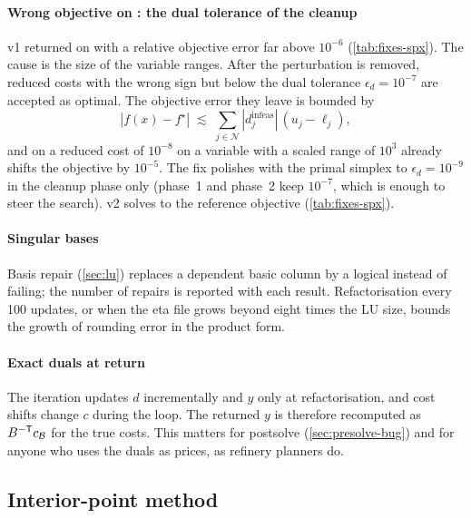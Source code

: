 \paragraph{Wrong objective on : the dual tolerance of the cleanup}
v1 returned  on  with a relative objective error far above $10^{-6}$
(\cref{tab:fixes-spx}). The cause is the size of the variable ranges. After the perturbation is removed, reduced costs with the
wrong sign but below the dual tolerance $\epsilon_d=10^{-7}$ are accepted as optimal. The objective
error they leave is bounded by
\begin{equation}\label{eq:dualerr}
  |f(x)-f^\star| \;\lesssim\; \sum_{j\in\mathcal N} |d_j^{\text{infeas}}|\,(u_j-\ell_j),
\end{equation}
and on  a reduced cost of $10^{-8}$ on a variable with a scaled range of $10^3$ already
shifts the objective by $10^{-5}$. The fix polishes with the primal simplex to $\epsilon_d=10^{-9}$ in
the cleanup phase only (phase~1 and phase~2 keep $10^{-7}$, which is enough to steer the search).
v2 solves  to the reference objective (\cref{tab:fixes-spx}).

\paragraph{Singular bases}
Basis repair (\cref{sec:lu}) replaces a dependent basic column by a logical instead of failing; the
number of repairs is reported with each result. Refactorisation every 100 updates, or when the eta
file grows beyond eight times the LU size, bounds the growth of rounding error in the product form.

\paragraph{Exact duals at return}
The iteration updates $d$ incrementally and $y$ only at refactorisation, and cost shifts change $c$
during the loop. The returned $y$ is therefore recomputed as $B^{-\mathsf{T}} c_{\mathcal B}$ for the true costs.
This matters for postsolve (\cref{sec:presolve-bug}) and for anyone who uses the duals as prices, as
refinery planners do.

\subsection{Interior-point method}

